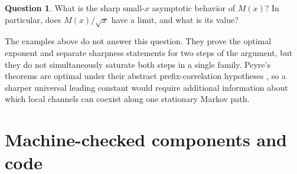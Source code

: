 \documentclass[11pt]{amsart}
\numberwithin{equation}{section}
\theoremstyle{definition}
\newtheorem{question}[theorem]{Question}
\begin{document}
\begin{question}
What is the sharp small-$x$ asymptotic behavior of $M(x)$? In particular, does $M(x)/\sqrt{x}$ have a limit, and what is its value?
\end{question}

The examples above do not answer this question. They prove the optimal exponent and separate sharpness statements for two steps of the argument, but they do not simultaneously saturate both steps in a single family. Peyre's theorems are optimal under their abstract prefix-correlation hypotheses \cite[Section~3.5]{Peyre2010}, so a sharper universal leading constant would require additional information about which local channels can coexist along one stationary Markov path.

\section{Machine-checked components and code}\label{sec:code}
\end{document}
